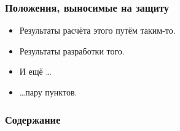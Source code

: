 \begin{frame}
    \setcounter{framenumber}{1}
    \maketitle
\end{frame}

\begin{frame}
    \frametitle{Положения, выносимые на защиту}
    \begin{itemize}[beginpenalty=10000, midpenalty=10000, wide=\parindent, leftmargin=0pt]
        \item Результаты расчёта этого путём таким-то.
        \item Результаты разработки того.
        \item И ещё \dots
        \item \dots пару пунктов.
    \end{itemize}
\end{frame}

\begin{frame}
    \frametitle{Содержание}
    \tableofcontents
\end{frame}
